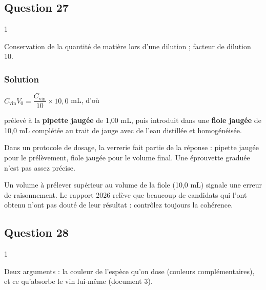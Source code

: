 \documentclass[11pt,a4paper]{article}
\newcommand{\equationajustee}[1]{%
  \sbox{\boiteequation}{$\displaystyle #1$}%
  \ifdim\wd\boiteequation>\linewidth
    \[\resizebox{\linewidth}{!}{\usebox{\boiteequation}}\]%
  \else
    \[#1\]%
  \fi}
\begin{document}
\hypertarget{question-27}{%
\subsection{Question 27}\label{question-27}}

\begin{indication}{1}

Conservation de la quantité de matière lors d'une dilution ; facteur de dilution 10.

\end{indication}

\hypertarget{solution-26}{%
\subsubsection{Solution}\label{solution-26}}

\(C_{\text{vin}}V_0=\dfrac{C_{\text{vin}}}{10}\times10{,}0\) mL, d'où

\equationajustee{\boxed{V_0=1{,}0\ \text{mL}}}

prélevé à la \textbf{pipette jaugée} de 1,00 mL, puis introduit dans une \textbf{fiole jaugée} de 10,0 mL complétée au trait de jauge avec de l'eau distillée et homogénéisée.

\begin{methode}

Dans un protocole de dosage, la verrerie fait partie de la réponse : pipette jaugée pour le prélèvement, fiole jaugée pour le volume final. Une éprouvette graduée n'est pas assez précise.

\end{methode}

\begin{piege}

Un volume à prélever supérieur au volume de la fiole (10,0 mL) signale une erreur de raisonnement. Le rapport 2026 relève que beaucoup de candidats qui l'ont obtenu n'ont pas douté de leur résultat : contrôlez toujours la cohérence.

\end{piege}

\hypertarget{question-28}{%
\subsection{Question 28}\label{question-28}}

\begin{indication}{1}

Deux arguments : la couleur de l'espèce qu'on dose (couleurs complémentaires), et ce qu'absorbe le vin lui-même (document 3).

\end{indication}
\end{document}
